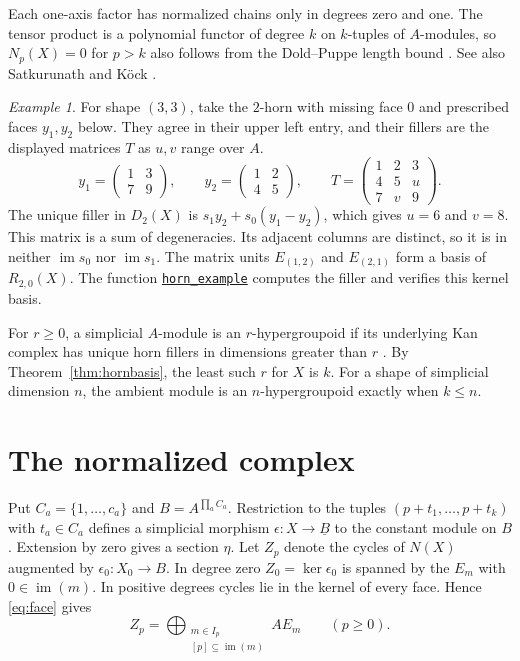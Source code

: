 \documentclass[11pt]{article}
\theoremstyle{definition}
\theoremstyle{remark}
\newtheorem{example}[theorem]{Example}
\DeclareMathOperator{\im}{im}
\newcommand{\program}[2]{\href{https://github.com/flengyel/SimplicialTensors/blob/c6802c6692215b688864dc18cd9ff3073b804d71/#1}{\nolinkurl{#2}}}
\begin{document}
Each one-axis factor has normalized chains only in degrees zero and one.
The tensor product is a polynomial functor of degree $k$ on $k$-tuples of $A$-modules, so
$N_p(X)=0$ for $p>k$ also follows from the Dold--Puppe length bound
\cite[Hilfssatz~4.23]{DoldPuppe}. See also Satkurunath and K\"ock
\cite[Corollary~4.6]{SatkurunathKock}.

\begin{example}\label{ex:matrix-horn}
For shape $(3,3)$, take the $2$-horn with missing face $0$ and prescribed
faces $y_1,y_2$ below. They agree in their upper left entry, and their
fillers are the displayed matrices $T$ as $u,v$ range over $A$.
\[
 y_1=\begin{pmatrix}1&3\\7&9\end{pmatrix},\qquad
 y_2=\begin{pmatrix}1&2\\4&5\end{pmatrix},\qquad
 T=\begin{pmatrix}1&2&3\\4&5&u\\7&v&9\end{pmatrix}.
\]
The unique filler in $D_2(X)$ is $s_1y_2+s_0(y_1-y_2)$, which gives
$u=6$ and $v=8$. This matrix is a sum of degeneracies. Its adjacent columns
are distinct, so it is in neither $\im s_0$ nor $\im s_1$.
The matrix units $E_{(1,2)}$ and $E_{(2,1)}$
form a basis of $R_{2,0}(X)$. The function \program{tex/anc/dstm_examples.py\#L101}{horn_example}
computes the filler and verifies this kernel basis.
\end{example}

For $r\geq0$, a simplicial $A$-module is an $r$-hypergroupoid if its
underlying Kan complex has unique horn fillers in dimensions greater
than $r$ \cite{Duskin1979,Glenn1982}. By Theorem~\ref{thm:hornbasis},
the least such $r$ for $X$ is $k$.
For a shape of simplicial dimension $n$, the ambient module is an
$n$-hypergroupoid exactly when $k\leq n$.

\section{The normalized complex}\label{sec:normalized}
Put $C_a=\{1,\ldots,c_a\}$ and $B=A^{\prod_a C_a}$. Restriction to
the tuples $(p+t_1,\ldots,p+t_k)$ with $t_a\in C_a$ defines a simplicial
morphism $\epsilon:X\to\underline B$ to the constant module on $B$. Extension by zero gives a
section $\eta$. Let $Z_p$ denote the cycles of $N(X)$ augmented by
$\epsilon_0:X_0\to B$. In degree zero $Z_0=\ker\epsilon_0$ is spanned by
the $E_m$ with $0\in\im(m)$. In positive degrees cycles lie in the kernel of
every face. Hence \eqref{eq:face} gives
\begin{equation}\label{eq:cycles}
 Z_p=\bigoplus_{\substack{m\in I_p\\{}[p]\subseteq\im(m)}} AE_m
 \qquad(p\geq0).
\end{equation}
\end{document}
